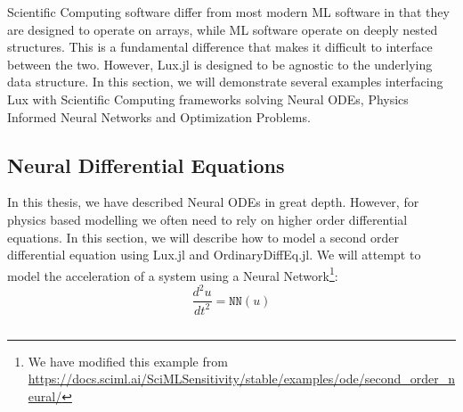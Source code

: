 Scientific Computing software differ from most modern ML software in that they are designed to operate on arrays, while ML software operate on deeply nested structures. This is a fundamental difference that makes it difficult to interface between the two. However, Lux.jl is designed to be agnostic to the underlying data structure. In this section, we will demonstrate several examples interfacing Lux with Scientific Computing frameworks solving Neural ODEs, Physics Informed Neural Networks and Optimization Problems.

\subsection{Neural Differential Equations}
\label{subsec:differential_equations_lux}

In this thesis, we have described Neural ODEs in great depth. However, for physics based modelling we often need to rely on higher order differential equations. In this section, we will describe how to model a second order differential equation using Lux.jl and OrdinaryDiffEq.jl. We will attempt to model the acceleration of a system using a Neural Network\footnote{We have modified this example from \url{https://docs.sciml.ai/SciMLSensitivity/stable/examples/ode/second_order_neural/}}:
%
\begin{equation}
  \frac{d^2u}{dt^2} = \texttt{NN}(u)
\end{equation}
%

\inputminted[linenos, breaklines, fontsize=\scriptsize, frame=single, framesep=10pt]{julia}{../code/diffeq.jl}

